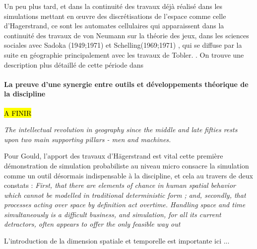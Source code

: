 Un peu plus tard, et dans la continuité des travaux déjà réalisé dans les simulations mettant en œuvre des discrétisations de l'espace comme celle d'Hagerstrand, ce sont les automates cellulaires qui apparaissent dans la continuité des travaux de von Neumann sur la théorie des jeux, dans les sciences sociales avec Sadoka (1949;1971) et Schelling(1969;1971) \autocite{Ganguly2003}, qui se diffuse par la suite en géographie principalement avec les travaux de Tobler. \autocite{Tobler1970b} \autocite{Tobler1979}. On trouve une description plus détaillé de cette période dans \autocite{Louail2010}

\paragraph{La preuve d'une synergie entre outils et développements théorique de la discipline}

\hl{A FINIR}

\textit{The intellectual revolution in geography since the middle and late fifties rests upon two main supporting pillars - men and machines.}

Pour Gould, l'apport des travaux d'Hägerstrand est vital cette première démonstration de simulation probabiliste au niveau micro consacre la simulation comme un outil désormais indispensable à la discipline, et cela au travers de deux constats : \textit{First, that there are elements of chance in human spatial behavior which cannot be modelled in traditional deterministic form ; and, secondly, that processes acting over space by definition act overtime. Handling space and time simultaneously is a difficult business, and simulation, for all its current detractors, often appears to offer the only feasible way out} \autocite{Gould1970}

L'introduction de la dimension spatiale et temporelle est importante ici ... 




